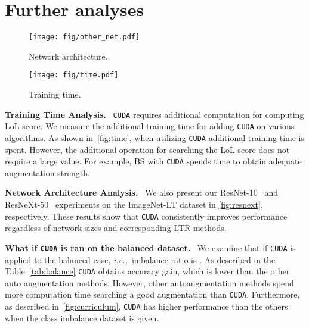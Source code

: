 \documentclass{article}
\newcommand{\ie}{\emph{i.e.,~}}
\newcommand{\myparagraph}[1]{\vspace{0.07cm}\noindent\textbf{#1}~}
\def\code#1{\texttt{#1}}
\newcommand{\alg}{\code{CUDA}\xspace}
\renewcommand*\cite[1]{\citep{#1}}
\begin{document}
%
 
\section{Further analyses}
\label{app:analysis}
\begin{figure}[t]
    \centering
    \begin{minipage}{0.45\linewidth}
            \texttt{[image: fig/other\_net.pdf]}
            \caption{Network architecture.}
            \label{fig:resnext}
    \end{minipage}
    \hfill
    \begin{minipage}{0.45\linewidth}
        \vspace{5pt}
          \texttt{[image: fig/time.pdf]}
          \vspace{4pt}
          \caption{Training time.}
          \label{fig:time}
    \end{minipage}
\end{figure}

\myparagraph{Training Time Analysis.} \alg requires additional computation for computing LoL score. We measure the additional training time for adding \alg on various algorithms. As shown in~\autoref{fig:time}, when utilizing \alg additional training time is spent. However, the additional operation for searching the LoL score does not require a large value. For example, BS with \alg spends  time to obtain adequate augmentation strength. 

\myparagraph{Network Architecture Analysis.} We also present our ResNet-10~\cite{liu2019large} and ResNeXt-50~\cite{xie2017aggregated} experiments on the ImageNet-LT dataset in \autoref{fig:resnext}, respectively. These results show that \alg consistently improves performance regardless of network sizes and corresponding LTR methods.

\myparagraph{What if \alg is ran on the balanced dataset.}
We examine that if \alg is applied to the balanced case, \ie imbalance ratio is . As described in the Table~\ref{tab:balance} \alg obtains  accuracy gain, which is lower than the other auto augmentation methods. However, other autoaugmentation methods spend more computation time searching a good augmentation than \alg. Furthermore, as described in~\autoref{fig:curriculum}, \alg has higher performance than the others when the class imbalance dataset is given. 
\end{document}
